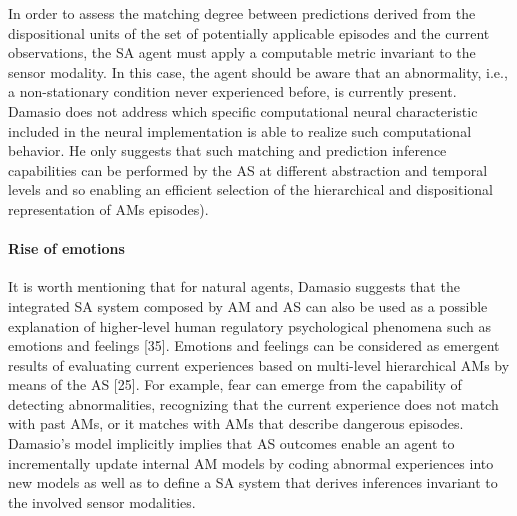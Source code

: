 \documentclass{article}
\begin{document}
			In order to assess the matching degree between predictions derived from the dispositional units of the set of potentially applicable episodes and the current observations, the SA agent must apply a computable metric invariant to the sensor modality. In this case, the agent should be aware that an
			abnormality, i.e., a non-stationary condition never experienced before, is currently present. Damasio does not address which specific computational neural characteristic included in the neural implementation is able to realize such computational behavior. He only suggests that such matching and prediction inference capabilities can be performed by the AS at different abstraction and temporal levels and so enabling an efficient selection of the hierarchical and dispositional representation of AMs episodes).
			\paragraph{Rise of emotions} It is worth mentioning that for natural agents, Damasio suggests that the integrated SA system composed by AM and AS can also be used as a possible explanation of higher-level human regulatory psychological phenomena such as emotions and feelings \citet{regazzoni-2020-multi-sensorial-generative-and-descriptive-self-awareness-models-for-autonomous-systems}[35]. Emotions and feelings can be considered as emergent results of evaluating current experiences based on multi-level hierarchical AMs by means of the AS \citet{regazzoni-2020-multi-sensorial-generative-and-descriptive-self-awareness-models-for-autonomous-systems}[25].
			For example, fear can emerge from the capability of detecting abnormalities, recognizing that the current experience does not match with past AMs, or it matches with AMs that describe dangerous episodes. Damasio’s model implicitly implies that AS outcomes enable an agent to incrementally update internal AM models by coding abnormal experiences into new models as well as to define a SA system that derives inferences invariant to the involved sensor modalities.
			
			
\end{document}
